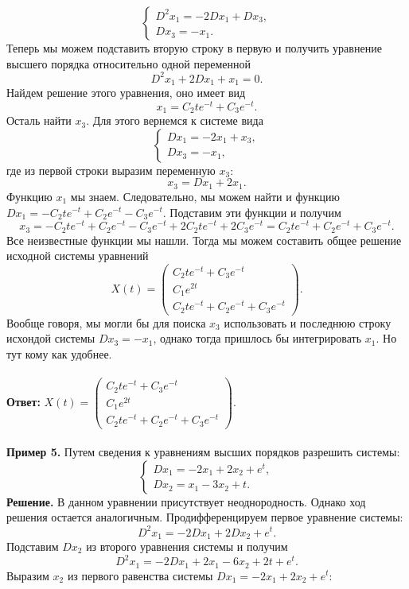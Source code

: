 \documentclass[a4paper, 12pt]{article}
\begin{document}
$$\begin{cases}
	D^2x_1 = -2Dx_1 + Dx_3,\\
	Dx_3 = -x_1.
\end{cases}$$
Теперь мы можем подставить вторую строку в первую и получить уравнение высшего порядка относительно одной переменной $$D^2x_1+2Dx_1 + x_1 = 0.$$
Найдем решение этого уравнения, оно имеет вид $$x_1 = C_2te^{-t} + C_3e^{-t}.$$
Осталь найти $x_3$. Для этого вернемся к системе вида $$\begin{cases}
	Dx_1 = -2x_1 + x_3,\\
	Dx_3 = -x_1,
\end{cases}$$
где из первой строки выразим переменную $x_3$:
$$x_3 = Dx_1 + 2x_1.$$
Функцию $x_1$ мы знаем. Следовательно, мы можем найти и функцию $Dx_1 = -C_2te^{-t} + C_2e^{-t} -C_3e^{-t}.$
Подставим эти функции и получим $$x_3 = -C_2te^{-t} + C_2e^{-t} -C_3e^{-t} + 2C_2te^{-t} + 2C_3e^{-t} = C_2te^{-t} + C_2e^{-t} + C_3e^{-t}.$$
Все неизвестные функции мы нашли. Тогда мы можем составить общее решение исходной системы уравнений $$X(t) = \begin{pmatrix}
	C_2te^{-t} + C_3e^{-t}\\
	C_1e^{2t}\\
	C_2te^{-t} + C_2e^{-t} + C_3e^{-t}
\end{pmatrix}.$$
Вообще говоря, мы могли бы для поиска $x_3$ использовать и последнюю строку исхондой системы $Dx_3 = -x_1$, однако тогда пришлось бы интегрировать $x_1$. Но тут кому как удобнее.\\\\
\textbf{Ответ:} $X(t) = \begin{pmatrix}
	C_2te^{-t} + C_3e^{-t}\\
	C_1e^{2t}\\
	C_2te^{-t} + C_2e^{-t} + C_3e^{-t}
\end{pmatrix}$.\\\\
\textbf{Пример 5.} Путем сведения к уравнениям высших порядков разрешить системы:
$$\begin{cases}
	Dx_1 = -2x_1 + 2x_2 + e^t,\\
	Dx_2 = x_1 -3 x_2 + t.
\end{cases}$$
\textbf{Решение.} В данном уравнении присутствует неоднородность. Однако ход решения остается аналогичным. Продифференцируем первое уравнение системы:
$$D^2x_1 = -2Dx_1 + 2Dx_2 + e^t.$$
Подставим $Dx_2$ из второго уравнения системы и получим
$$D^2x_1 = -2Dx_1 + 2x_1 - 6x_2 + 2t + e^t.$$
Выразим $x_2$ из первого равенства системы $Dx_1 = -2x_1 + 2x_2 + e^t$:
\end{document}
